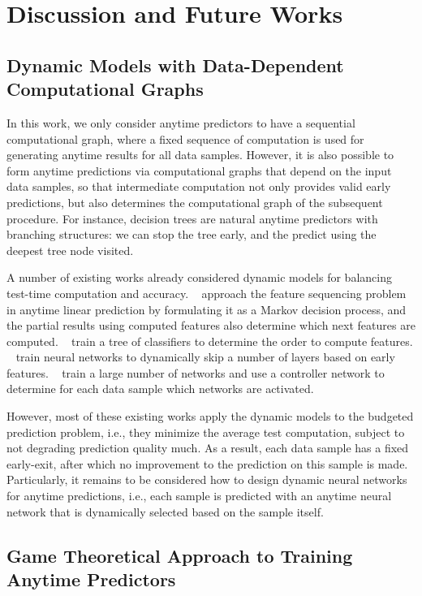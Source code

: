 


\section{Discussion and Future Works}



\subsection{Dynamic Models with Data-Dependent Computational Graphs}
In this work, we only consider anytime predictors to have a sequential computational graph, where
a fixed sequence of computation is used for generating anytime results for all data samples.
However, it is also possible to form anytime predictions via computational graphs that depend 
on the input data samples, so that intermediate computation not only provides valid early predictions, but also determines
the computational graph of the subsequent procedure.
For instance, decision trees are natural anytime predictors with branching structures: we can 
stop the tree early, and the predict using the deepest tree node visited. 

A number of existing works already considered dynamic models for balancing test-time computation and accuracy. 
~\citep{timeliness}
approach the feature sequencing problem in anytime linear prediction by formulating it as a Markov
decision process, and the partial results using computed features also determine which next features
are computed. ~\citep{xu:13a} train a tree of classifiers to determine the order to compute features.
~\citep{wang2017skipnet} train neural networks to dynamically skip a number of layers based on early features.
~\citep{outrageouslylarge} train a large number of networks and use a controller network to determine 
for each data sample which networks are activated. 

However, most of these existing works apply the dynamic models to the budgeted prediction problem, i.e., 
they minimize the average test computation, subject to not degrading prediction quality much. As a result,
each data sample has a fixed early-exit, after which no improvement to the prediction on this sample is made.
Particularly, it remains to be considered how to design dynamic neural networks for anytime predictions, i.e.,
each sample is predicted with an anytime neural network that is dynamically selected based on the sample itself.


\subsection{Game Theoretical Approach to Training Anytime Predictors}

